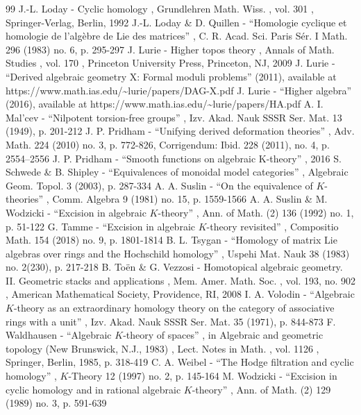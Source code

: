 \documentclass[11pt]{article}
\theoremstyle{definition}
\begin{document}
\begin{thebibliography}{99}
 J.-L. Loday - Cyclic homology , Grundlehren Math. Wiss. , vol. 301 , Springer-Verlag, Berlin, 1992
 J.-L. Loday \& D. Quillen - “Homologie cyclique et homologie de l’algèbre de Lie des matrices” , C. R. Acad. Sci. Paris Sér. I Math. 296 (1983) no. 6, p. 295-297
 J. Lurie - Higher topos theory , Annals of Math. Studies , vol. 170 , Princeton University Press, Princeton, NJ, 2009
 J. Lurie - “Derived algebraic geometry X: Formal moduli problems” (2011), available at https://www.math.ias.edu/\textasciitilde{}lurie/papers/DAG-X.pdf
 J. Lurie - “Higher algebra” (2016), available at https://www.math.ias.edu/\textasciitilde{}lurie/papers/HA.pdf
 A. I. Mal’cev - “Nilpotent torsion-free groups” , Izv. Akad. Nauk SSSR Ser. Mat. 13 (1949), p. 201-212
 J. P. Pridham - “Unifying derived deformation theories” , Adv. Math. 224 (2010) no. 3, p. 772-826, Corrigendum: Ibid. 228 (2011), no. 4, p. 2554–2556
 J. P. Pridham - “Smooth functions on algebraic K-theory” , 2016
 S. Schwede \& B. Shipley - “Equivalences of monoidal model categories” , Algebraic Geom. Topol. 3 (2003), p. 287-334
 A. A. Suslin - “On the equivalence of $K$-theories” , Comm. Algebra 9 (1981) no. 15, p. 1559-1566
 A. A. Suslin \& M. Wodzicki - “Excision in algebraic $K$-theory” , Ann. of Math. (2) 136 (1992) no. 1, p. 51-122
 G. Tamme - “Excision in algebraic $K$-theory revisited” , Compositio Math. 154 (2018) no. 9, p. 1801-1814
 B. L. Tsygan - “Homology of matrix Lie algebras over rings and the Hochschild homology” , Uspehi Mat. Nauk 38 (1983) no. 2(230), p. 217-218
 B. Toën \& G. Vezzosi - Homotopical algebraic geometry. II. Geometric stacks and applications , Mem. Amer. Math. Soc. , vol. 193, no. 902 , American Mathematical Society, Providence, RI, 2008
 I. A. Volodin - “Algebraic $K$-theory as an extraordinary homology theory on the category of associative rings with a unit” , Izv. Akad. Nauk SSSR Ser. Mat. 35 (1971), p. 844-873
 F. Waldhausen - “Algebraic $K$-theory of spaces” , in Algebraic and geometric topology (New Brunswick, N.J., 1983) , Lect. Notes in Math. , vol. 1126 , Springer, Berlin, 1985, p. 318-419
 C. A. Weibel - “The Hodge filtration and cyclic homology” , $K$-Theory 12 (1997) no. 2, p. 145-164
 M. Wodzicki - “Excision in cyclic homology and in rational algebraic $K$-theory” , Ann. of Math. (2) 129 (1989) no. 3, p. 591-639
\end{thebibliography}
\end{document}
